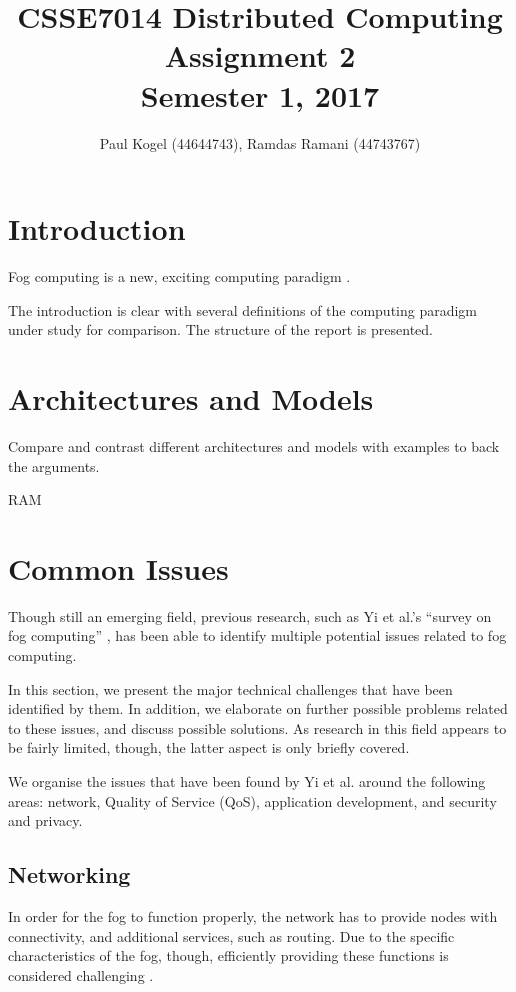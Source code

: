 \documentclass{article}
\title{CSSE7014 Distributed Computing \\
Assignment 2 \\
Semester 1, 2017}
\author{Paul Kogel (44644743), Ramdas Ramani (44743767)}
\begin{document}
\maketitle

\pagebreak
\tableofcontents\thispagestyle{plain}

\pagebreak

\section{Introduction}

Fog computing is a new, exciting computing paradigm \cite{bonomi2012fog}.

The introduction is clear with several definitions of the computing paradigm under study for comparison. The structure of the report is presented.

\section{Architectures and Models}
Compare and contrast different architectures and models with examples to back the arguments.

RAM


\section{Common Issues}
Though still an emerging field, previous research, such as Yi et al.'s ``survey on fog computing'' \cite{yi2015survey}, has been able to identify multiple potential issues related to fog computing.

In this section, we present the major technical challenges that have been identified by them. In addition, we elaborate on further possible problems related to these issues, and discuss possible solutions. As research in this field appears to be fairly limited, though, the latter aspect is only briefly covered.

We organise the issues that have been found by Yi et al. around the following areas: network, Quality of Service (QoS), application development, and security and privacy.

\subsection{Networking}
In order for the fog to function properly, the network has to provide nodes with connectivity, and additional services, such as routing. Due to the specific characteristics of the fog, though, efficiently providing these functions is considered challenging \cite{yi2015survey}.
\end{document}
